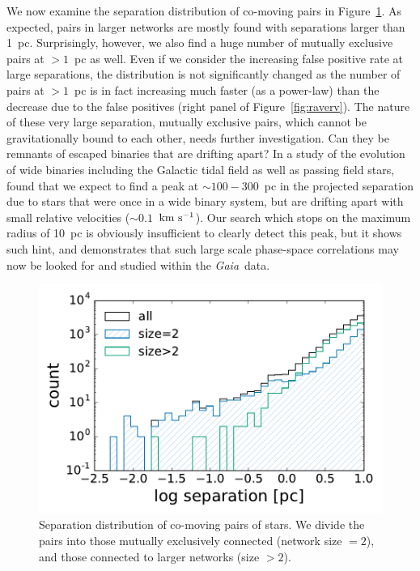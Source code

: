 \documentclass[manuscript, letterpaper]{aastex6}
\newcommand{\project}[1]{\textsl{#1}}
\newcommand{\gaia}{\project{Gaia}}
\newcommand{\kms}{\ensuremath{\rm km~s^{-1}}}
\begin{document}
We now examine the separation distribution of co-moving pairs in
Figure~\ref{fig:hist_separation}.
As expected, pairs in larger networks are mostly found with separations
larger than 1~pc.
Surprisingly, however, we also find a huge number of mutually exclusive pairs
at $>1$~pc as well. Even if we consider the increasing false positive rate at large
separations, the distribution is not significantly changed as the number of pairs
at $>1$~pc is in fact increasing much faster (as a power-law)
than the decrease due to the false positives (right panel of Figure~\ref{fig:raverv}).
The nature of these very large separation, mutually exclusive pairs,
which cannot be gravitationally bound to each other, needs further investigation.
Can they be remnants of escaped binaries that are drifting apart?
In a study of the evolution of wide binaries including the Galactic tidal field
as well as passing field stars, \citet{Jiang:2010aa} found that we expect 
to find a peak at $\sim 100-300$~pc in the projected separation due to
stars that were once in a wide binary system, but are drifting apart with small
relative velocities ($\sim 0.1$~\kms).
Our search which stops on the maximum radius of 10~pc is obviously insufficient
to clearly detect this peak, but it shows such hint, and demonstrates
that such large scale phase-space correlations may now be looked for and studied within the \gaia\ data.

\begin{figure}[htbp]
  \begin{center}
    \includegraphics[width=\textwidth]{figures/hist_sep.pdf}
  \end{center}
  \caption{%
    Separation distribution of co-moving pairs of stars. 
    We divide the pairs into those mutually exclusively connected
    (network size $=2$), and those connected to larger networks (size $>2$).
    \label{fig:hist_separation}
    }
\end{figure}
\end{document}
